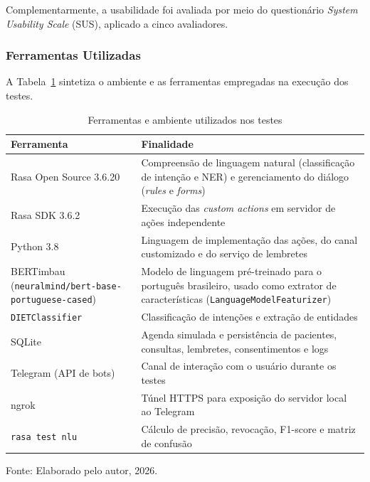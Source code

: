 \documentclass[12pt,a4paper]{extarticle}
\begin{document}
Complementarmente, a usabilidade foi avaliada por meio do questionário \textit{System Usability Scale} (SUS), aplicado a cinco avaliadores.

\subsubsection{Ferramentas Utilizadas}
\label{sec:ferramentas}

A Tabela~\ref{tab:ferramentas} sintetiza o ambiente e as ferramentas empregadas na execução dos testes.

\begin{table}[H]
\centering
\caption{Ferramentas e ambiente utilizados nos testes}
\label{tab:ferramentas}
\begin{tabular}{p{4.2cm}p{9cm}}
\hline
\textbf{Ferramenta} & \textbf{Finalidade} \\
\hline
Rasa Open Source 3.6.20 & Compreensão de linguagem natural (classificação de intenção e NER) e gerenciamento do diálogo (\textit{rules} e \textit{forms}) \\
Rasa SDK 3.6.2 & Execução das \textit{custom actions} em servidor de ações independente \\
Python 3.8 & Linguagem de implementação das ações, do canal customizado e do serviço de lembretes \\
BERTimbau (\texttt{neuralmind/\allowbreak bert-base-\allowbreak portuguese-cased}) & Modelo de linguagem pré-treinado para o português brasileiro, usado como extrator de características (\texttt{LanguageModel\allowbreak{}Featurizer}) \\
\texttt{DIETClassifier} & Classificação de intenções e extração de entidades \\
SQLite & Agenda simulada e persistência de pacientes, consultas, lembretes, consentimentos e logs \\
Telegram (API de bots) & Canal de interação com o usuário durante os testes \\
ngrok & Túnel HTTPS para exposição do servidor local ao Telegram \\
\texttt{rasa test nlu} & Cálculo de precisão, revocação, F1-score e matriz de confusão \\
\hline
\end{tabular}
\vspace{0.3cm}

\footnotesize{Fonte: Elaborado pelo autor, 2026.}
\end{table}

\end{document}
